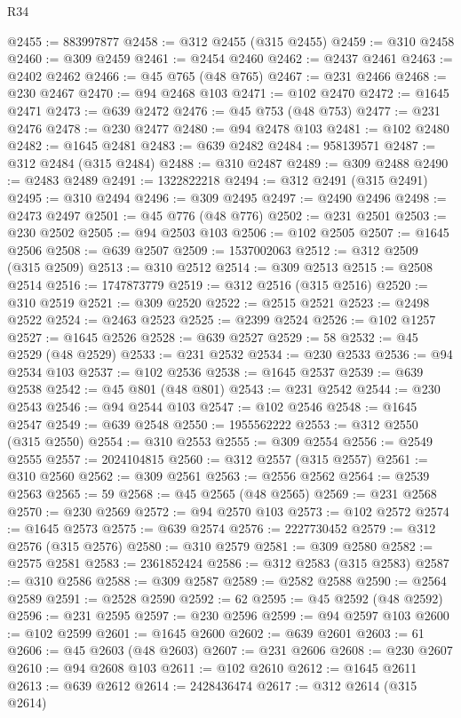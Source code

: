 \begin{lexlean}{R34}
\begin{coremodule}
@2455 := 883997877
@2458 := @312 @2455 (@315 @2455)
@2459 := @310 @2458
@2460 := @309 @2459
@2461 := @2454 @2460
@2462 := @2437 @2461
@2463 := @2402 @2462
@2466 := @45 @765 (@48 @765)
@2467 := @231 @2466
@2468 := @230 @2467
@2470 := @94 @2468 @103
@2471 := @102 @2470
@2472 := @1645 @2471
@2473 := @639 @2472
@2476 := @45 @753 (@48 @753)
@2477 := @231 @2476
@2478 := @230 @2477
@2480 := @94 @2478 @103
@2481 := @102 @2480
@2482 := @1645 @2481
@2483 := @639 @2482
@2484 := 958139571
@2487 := @312 @2484 (@315 @2484)
@2488 := @310 @2487
@2489 := @309 @2488
@2490 := @2483 @2489
@2491 := 1322822218
@2494 := @312 @2491 (@315 @2491)
@2495 := @310 @2494
@2496 := @309 @2495
@2497 := @2490 @2496
@2498 := @2473 @2497
@2501 := @45 @776 (@48 @776)
@2502 := @231 @2501
@2503 := @230 @2502
@2505 := @94 @2503 @103
@2506 := @102 @2505
@2507 := @1645 @2506
@2508 := @639 @2507
@2509 := 1537002063
@2512 := @312 @2509 (@315 @2509)
@2513 := @310 @2512
@2514 := @309 @2513
@2515 := @2508 @2514
@2516 := 1747873779
@2519 := @312 @2516 (@315 @2516)
@2520 := @310 @2519
@2521 := @309 @2520
@2522 := @2515 @2521
@2523 := @2498 @2522
@2524 := @2463 @2523
@2525 := @2399 @2524
@2526 := @102 @1257
@2527 := @1645 @2526
@2528 := @639 @2527
@2529 := 58
@2532 := @45 @2529 (@48 @2529)
@2533 := @231 @2532
@2534 := @230 @2533
@2536 := @94 @2534 @103
@2537 := @102 @2536
@2538 := @1645 @2537
@2539 := @639 @2538
@2542 := @45 @801 (@48 @801)
@2543 := @231 @2542
@2544 := @230 @2543
@2546 := @94 @2544 @103
@2547 := @102 @2546
@2548 := @1645 @2547
@2549 := @639 @2548
@2550 := 1955562222
@2553 := @312 @2550 (@315 @2550)
@2554 := @310 @2553
@2555 := @309 @2554
@2556 := @2549 @2555
@2557 := 2024104815
@2560 := @312 @2557 (@315 @2557)
@2561 := @310 @2560
@2562 := @309 @2561
@2563 := @2556 @2562
@2564 := @2539 @2563
@2565 := 59
@2568 := @45 @2565 (@48 @2565)
@2569 := @231 @2568
@2570 := @230 @2569
@2572 := @94 @2570 @103
@2573 := @102 @2572
@2574 := @1645 @2573
@2575 := @639 @2574
@2576 := 2227730452
@2579 := @312 @2576 (@315 @2576)
@2580 := @310 @2579
@2581 := @309 @2580
@2582 := @2575 @2581
@2583 := 2361852424
@2586 := @312 @2583 (@315 @2583)
@2587 := @310 @2586
@2588 := @309 @2587
@2589 := @2582 @2588
@2590 := @2564 @2589
@2591 := @2528 @2590
@2592 := 62
@2595 := @45 @2592 (@48 @2592)
@2596 := @231 @2595
@2597 := @230 @2596
@2599 := @94 @2597 @103
@2600 := @102 @2599
@2601 := @1645 @2600
@2602 := @639 @2601
@2603 := 61
@2606 := @45 @2603 (@48 @2603)
@2607 := @231 @2606
@2608 := @230 @2607
@2610 := @94 @2608 @103
@2611 := @102 @2610
@2612 := @1645 @2611
@2613 := @639 @2612
@2614 := 2428436474
@2617 := @312 @2614 (@315 @2614)

\end{coremodule}
\end{lexlean}
